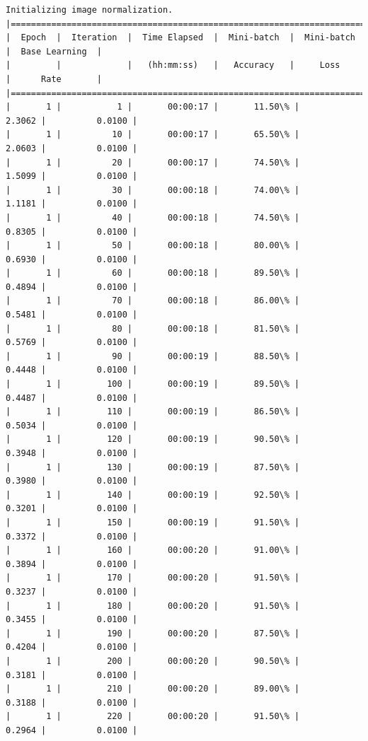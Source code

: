 \documentclass[11pt]{article}
\begin{document}
    \begin{Verbatim}[commandchars=\\\{\}]
Initializing image normalization.
|========================================================================================|
|  Epoch  |  Iteration  |  Time Elapsed  |  Mini-batch  |  Mini-batch  |  Base Learning  |
|         |             |   (hh:mm:ss)   |   Accuracy   |     Loss     |      Rate       |
|========================================================================================|
|       1 |           1 |       00:00:17 |       11.50\% |       2.3062 |          0.0100 |
|       1 |          10 |       00:00:17 |       65.50\% |       2.0603 |          0.0100 |
|       1 |          20 |       00:00:17 |       74.50\% |       1.5099 |          0.0100 |
|       1 |          30 |       00:00:18 |       74.00\% |       1.1181 |          0.0100 |
|       1 |          40 |       00:00:18 |       74.50\% |       0.8305 |          0.0100 |
|       1 |          50 |       00:00:18 |       80.00\% |       0.6930 |          0.0100 |
|       1 |          60 |       00:00:18 |       89.50\% |       0.4894 |          0.0100 |
|       1 |          70 |       00:00:18 |       86.00\% |       0.5481 |          0.0100 |
|       1 |          80 |       00:00:18 |       81.50\% |       0.5769 |          0.0100 |
|       1 |          90 |       00:00:19 |       88.50\% |       0.4448 |          0.0100 |
|       1 |         100 |       00:00:19 |       89.50\% |       0.4487 |          0.0100 |
|       1 |         110 |       00:00:19 |       86.50\% |       0.5034 |          0.0100 |
|       1 |         120 |       00:00:19 |       90.50\% |       0.3948 |          0.0100 |
|       1 |         130 |       00:00:19 |       87.50\% |       0.3980 |          0.0100 |
|       1 |         140 |       00:00:19 |       92.50\% |       0.3201 |          0.0100 |
|       1 |         150 |       00:00:19 |       91.50\% |       0.3372 |          0.0100 |
|       1 |         160 |       00:00:20 |       91.00\% |       0.3894 |          0.0100 |
|       1 |         170 |       00:00:20 |       91.50\% |       0.3237 |          0.0100 |
|       1 |         180 |       00:00:20 |       91.50\% |       0.3455 |          0.0100 |
|       1 |         190 |       00:00:20 |       87.50\% |       0.4204 |          0.0100 |
|       1 |         200 |       00:00:20 |       90.50\% |       0.3181 |          0.0100 |
|       1 |         210 |       00:00:20 |       89.00\% |       0.3188 |          0.0100 |
|       1 |         220 |       00:00:20 |       91.50\% |       0.2964 |          0.0100 |

\end{Verbatim}
\end{document}
